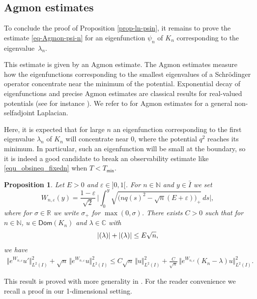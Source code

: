 \documentclass[10pt]{amsart}
\theoremstyle{plain}
\newtheorem{proposition}[theorem]{Proposition}
\theoremstyle{definition}
\newcommand{\abs}[1]{\vert #1\vert}
\newcommand{\bbabs}[1]{\biggl\vert #1\biggr\vert}
\newcommand{\nr}[1]{\Vert #1\Vert}
\newcommand{\bnr}[1]{\bigl\Vert #1\bigr\Vert}
\newcommand{\1}{\mathds 1}
\let\Re\relax
\DeclareMathOperator{\Re}{\mathsf{Re}\mkern2mu}
\let\Im\relax
\DeclareMathOperator{\Im}{\mathsf{Im}\mkern2mu}
\newcommand{\Dom}{\mathsf{Dom}}
\newcommand{\R}{\mathbb{R}}
\def\C{\mathbb{C}}
\newcommand{\N}{\mathbb{N}}
\let\e\varepsilon
\let\l\lambda
\let\s\sigma
\newcommand{\Tmin}{T_{\mathsf{min}}}
\begin{document}
\subsection{Agmon estimates} \label{sec-Agmon}

To conclude the proof of Proposition \ref{prop-ln-psin}, it remains to prove the estimate \eqref{eq-Agmon-psi-n} for an eigenfunction $\psi_n$ of $K_n$ corresponding to the eigenvalue~$\l_n$.

This estimate is given by an Agmon estimate. The Agmon estimates measure how the eigenfunctions corresponding to the smallest eigenvalues of a Schrödinger operator concentrate near the minimum of the potential. Exponential decay of eigenfunctions and precise Agmon estimates are classical results for real-valued potentials (see for instance \cite{Agmon85,helffer1}). We refer to \cite{KrejcirikRayRoySie17} for Agmon estimates for a general non-selfadjoint Laplacian.

Here, it is expected that for large $n$ an eigenfunction corresponding to the first eigenvalue $\l_n$ of $K_n$ will concentrate near 0, where the potential $q^2$ reaches its minimum. In particular, such an eigenfunction will be small at the boundary, so it is indeed a good candidate to break an observability estimate like \eqref{equ_obsineq_fixedn} when $T < \Tmin$.

\begin{proposition} \label{prop-Agmon}
Let $E > 0$ and $\e \in{}]0,1[$. For $n \in \N$ and $y \in \bar I$ we set
\begin{equation} \label{def-W}
W_{n,\e}(y) = \frac {1-\e} {\sqrt 2}\, \bbabs{\int_0^y \sqrt{\bigl(nq(s)^2 - \sqrt{n}(E + \e) \bigr)_+} \, ds},
\end{equation}
where for $\s \in \R$ we write $\s_+$ for $\max(0,\s)$. There exists $C > 0$ such that for $n \in \N$, $u \in \Dom(K_n)$ and $\l \in \C$ with
\begin{equation} \label{hyp-lambda}
\abs{\Re(\l)} + \abs{\Im(\l)} \leq E \sqrt n,
\end{equation}
we have
\begin{multline*}
\bnr{e^{W_{n,\e}} u'}_{L^2(I)}^2 + \sqrt n\,\bnr{e^{W_{n,\e}} u}_{L^2(I)}^2
\leq C \sqrt n\,\nr{u}_{L^2(I)}^2 +\frac {C}{\sqrt n}\, \bnr{e^{W_{n,\e}} (K_n-\l)u}_{L^2(I)}^2.
\end{multline*}
\end{proposition}

This result is proved with more generality in \cite{KrejcirikRayRoySie17}. For the reader convenience we recall a proof in our 1-dimensional setting.
\end{document}
